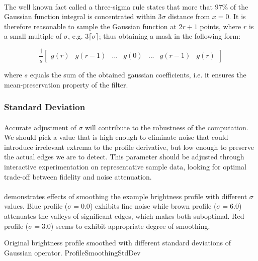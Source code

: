 \paragraph*{}
The well known fact called a three-sigma rule states that more that $97\%$ of the Gaussian function integral is concentrated within $3 \sigma$ distance from $x = 0$. It is therefore reasonable to sample the Gaussian function at $2r + 1$ points, where $r$ is a small multiple of $\sigma$, e.g. $3 \lceil \sigma \rceil$; thus obtaining a mask in the following form:

\[
    \frac{1}{s} \begin{bmatrix}
    g(r) & g(r-1) & ... & g(0) & ... & g(r-1) & g(r) 
    \end{bmatrix}
\]

where $s$ equals the sum of the obtained gaussian coefficients, i.e. it ensures the mean-preservation property of the filter.

\subsubsection{Standard Deviation}

\paragraph*{}
Accurate adjustment of $\sigma$ will contribute to the robustness of the computation. We should pick a value that is high enough to eliminate noise that could introduce irrelevant extrema to the profile derivative, but low enough to preserve the actual edges we are to detect. This parameter should be adjusted through interactive experimentation on representative sample data, looking for optimal trade-off between fidelity and noise attenuation. 

\paragraph*{}
 demonstrates effects of smoothing the example brightness profile with different $\sigma$ values. Blue profile ($\sigma = 0.0$) exhibits fine noise while brown profile ($\sigma = 6.0$) attenuates the valleys of significant edges, which makes both suboptimal. Red profile ($\sigma = 3.0$) seems to exhibit appropriate degree of smoothing.

\profileFigure
{
}
{Original brightness profile smoothed with different standard deviations of Gaussian operator.}
{ProfileSmoothingStdDev}

